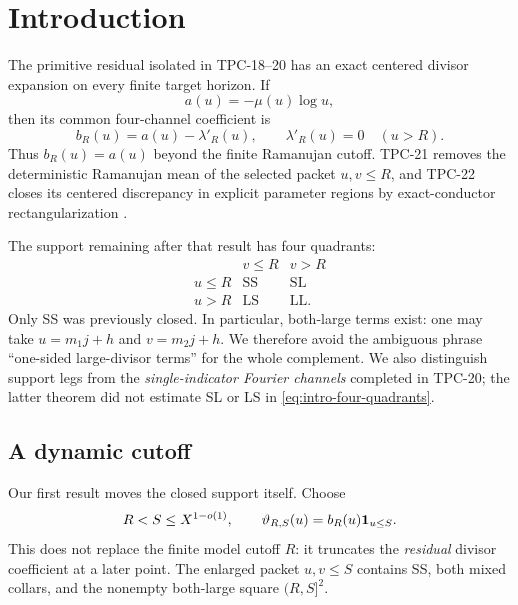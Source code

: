 \section{Introduction}
\label{sec:introduction}

The primitive residual isolated in TPC-18--20 has an exact centered
divisor expansion on every finite target horizon.  If
\[
 a(u)=-\mu(u)\log u,
\]
then its common four-channel coefficient is
\begin{equation}
 b_R(u)=a(u)-\lambda'_R(u),
 \qquad \lambda'_R(u)=0\quad(u>R).
 \label{eq:intro-bR}
\end{equation}
Thus \(b_R(u)=a(u)\) beyond the finite Ramanujan cutoff.  TPC-21
removes the deterministic Ramanujan mean of the selected packet
\(u,v\le R\), and TPC-22 closes its centered discrepancy in explicit
parameter regions by exact-conductor rectangularization
\citep{WangTPC18,WangTPC19,WangTPC20,WangTPC21,WangTPC22}.

The support remaining after that result has four quadrants:
\begin{equation}
 \begin{array}{c|cc}
  &v\le R&v>R\\ \hline
 u\le R&\mathrm{SS}&\mathrm{SL}\\
 u>R&\mathrm{LS}&\mathrm{LL}.
 \end{array}
 \label{eq:intro-four-quadrants}
\end{equation}
Only SS was previously closed.  In particular, both-large terms exist:
one may take \(u=m_1j+h\) and \(v=m_2j+h\).  We therefore avoid the
ambiguous phrase ``one-sided large-divisor terms'' for the whole
complement.  We also distinguish support legs from the
\emph{single-indicator Fourier channels} completed in TPC-20; the
latter theorem did not estimate SL or LS in
\eqref{eq:intro-four-quadrants}.

\subsection{A dynamic cutoff}

Our first result moves the closed support itself.  Choose
\begin{equation}
 R<S\le X^{1-o(1)},
 \qquad \vartheta_{R,S}(u)=b_R(u)\mathbf 1_{u\le S}.
 \label{eq:intro-dynamic-coefficient}
\end{equation}
This does not replace the finite model cutoff \(R\): it truncates the
\emph{residual} divisor coefficient at a later point.  The enlarged
packet \(u,v\le S\) contains SS, both mixed collars, and the nonempty
both-large square \((R,S]^2\).

